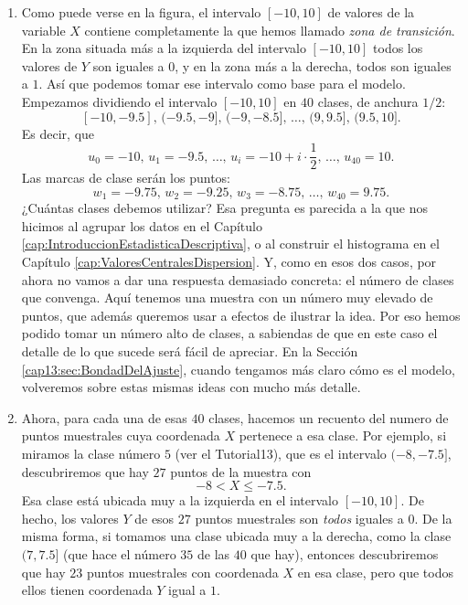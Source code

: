 \begin{ejemplo}
\begin{figure}[h!]
    \label{cap13:fig:EjemploConstruccionModeloLogistico01}
\end{figure}
\begin{enumerate}
  \item Como puede verse en la figura, el intervalo $[-10,10]$ de valores de la variable $X$ contiene completamente la que hemos llamado {\em zona de transición}. En la zona situada más a la izquierda del intervalo $[-10,10]$ todos los valores de $Y$ son iguales a $0$, y en la zona más a la derecha, todos son iguales a $1$. Así que podemos tomar ese intervalo como base para el modelo. Empezamos dividiendo el intervalo $[-10,10]$ en $40$ clases, de anchura $1/2$:
      \[[-10,-9.5], \,(-9.5,-9],\, (-9,-8.5],\, \ldots, \,(9,9.5], \,(9.5,10].\]
      Es decir, que
      \[u_0=-10,\, u_1=-9.5,\,\ldots,\,u_i=-10+i\cdot\dfrac{1}{2},\,\ldots,\,u_{40}=10.\]
      Las marcas de clase serán los puntos:
      \[w_1=-9.75,\,w_2=-9.25,\,w_3=-8.75,\,\ldots,\,w_{40}=9.75.\]
      ¿Cuántas clases debemos utilizar? Esa pregunta es parecida a la que nos hicimos al agrupar los datos en el Capítulo \ref{cap:IntroduccionEstadisticaDescriptiva}, o al construir el histograma en el Capítulo \ref{cap:ValoresCentralesDispersion}. Y, como en esos dos casos, por ahora no vamos a dar una respuesta demasiado concreta: el número de clases que convenga. Aquí tenemos una muestra con un número muy elevado de puntos, que además queremos usar a efectos de ilustrar la idea. Por eso hemos podido tomar un número alto de clases, a sabiendas de que en este caso el detalle de lo que sucede será fácil de apreciar. En la Sección \ref{cap13:sec:BondadDelAjuste}, cuando tengamos más claro cómo es el modelo, volveremos sobre estas mismas ideas con mucho más detalle.
  \item Ahora, para cada una de esas $40$ clases, hacemos un recuento del numero de puntos muestrales cuya coordenada $X$ pertenece a esa clase. Por ejemplo, si miramos la clase número $5$ (ver el Tutorial13), que es el intervalo $(-8,-7.5]$, descubriremos que hay $27$ puntos de la muestra con
      \[-8<X\leq -7.5.\]
      Esa clase está ubicada muy a la izquierda en el intervalo $[-10,10]$. De hecho, los valores $Y$ de esos $27$ puntos muestrales son {\em todos} iguales a $0$. De la misma forma, si tomamos una clase ubicada muy a la derecha, como la clase $(7,7.5]$ (que hace el número $35$ de las $40$ que hay), entonces descubriremos que hay $23$ puntos muestrales con coordenada $X$ en esa clase, pero que todos ellos tienen coordenada $Y$ igual a $1$.\\

\end{enumerate}
\end{ejemplo}
